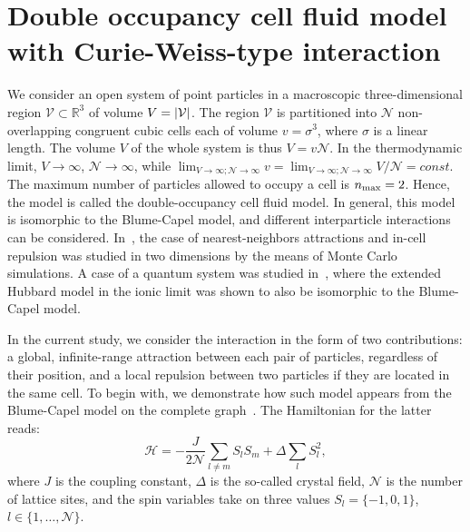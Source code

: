 \documentclass[pdflatex,sn-mathphys-num]{sn-jnl}%
\theoremstyle{thmstyleone}%
\theoremstyle{thmstyletwo}%
\theoremstyle{thmstylethree}%
\begin{document}
	\section{Double occupancy cell fluid model with Curie-Weiss-type interaction}
	We consider an open system of point particles in a macroscopic three-dimensional region ${\mathcal V} \subset \mathbb R^3$ of volume $V = \abs{\mathcal{V}}$. The region $\mathcal{V}$ is partitioned into $\mathscr{N}$ non-overlapping congruent cubic cells each of volume $v=\sigma^3$, where $\sigma$ is a linear length. The volume $V$ of the whole system is thus $V = v \mathscr{N}$. In the thermodynamic limit, $V \to \infty$, $\mathscr{N} \to \infty$, while $\lim_{V \to \infty; \mathscr{N} \to \infty}v = \lim_{V \to \infty; \mathscr{N} \to \infty} V/\mathscr{N} = const$. The maximum number of particles allowed to occupy a cell is $n_{\rm max} = 2$. Hence, the model is called the double-occupancy cell fluid model. In general, this model is isomorphic to the Blume-Capel model, and different interparticle interactions can be considered. In~\cite{LYZ21}, the case of nearest-neighbors attractions and in-cell repulsion was studied in two dimensions by the means of Monte Carlo simulations. A case of a quantum system was studied in~\cite{Mancini05}, where the extended Hubbard model in the ionic limit was shown to also be isomorphic to the Blume-Capel model.
	
	In the current study, we consider the interaction in the form of two contributions: a global, infinite-range attraction between each pair of particles, regardless of their position, and a local repulsion between two particles if they are located in the same cell. To begin with, we demonstrate how such model appears from the Blume-Capel model on the complete graph~\cite{HKBHK25}. The Hamiltonian for the latter reads:
	\begin{equation}
		\mathscr{H} = -\frac{J}{2\mathscr{N}} \sum_{l \neq m} S_l S_m + \Delta \sum_{l} S_l^2,
	\end{equation}
	where $J$ is the coupling constant, $\Delta$ is the so-called crystal field, $\mathscr{N}$ is the number of lattice sites, and the spin variables take on three values $S_l = \{-1, 0, 1\}$, $l \in \{1, \ldots, \mathscr{N}\}$.
	
\end{document}
